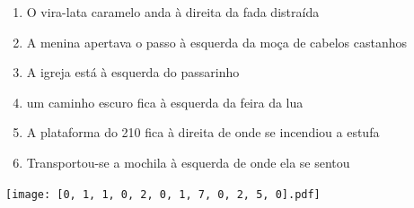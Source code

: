 \documentclass[12pt]{article}
\begin{document}
		 

\pagebreak


	\begin{enumerate}
		  \sffamily %
		  \large %


\vfill \item
O vira-lata caramelo anda	%
à direita
da fada distraída	%

\vfill \item
A menina apertava o passo	%
à esquerda
da moça de cabelos castanhos	%

\vfill \item
A igreja está	%
à esquerda
do passarinho	%

\vfill \item
um caminho escuro fica	%
à esquerda
da feira da lua	%

\vfill \item
A plataforma do 210 fica	%
à direita
de onde se incendiou a estufa	%

\vfill \item
Transportou-se a mochila	%
à esquerda
de onde ela se sentou	%
	\end{enumerate}
		  
		  \hfill

		  \vfill

\texttt{[image: [0, 1, 1, 0, 2, 0, 1, 7, 0, 2, 5, 0].pdf]}


	\hfill	  	  


\pagebreak			
\end{document}
